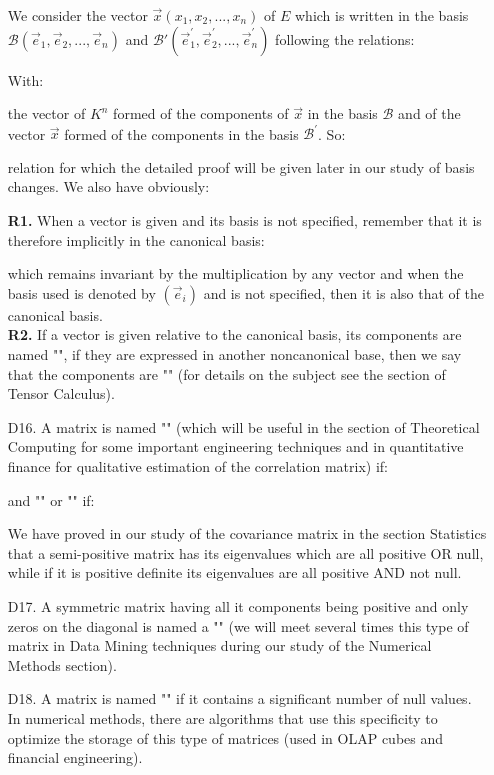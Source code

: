 \begin{enumerate}
		We consider the vector $\vec{x}(x_1,x_2,...,x_n)$ of $E$ which is written in the basis $\mathcal{B}(\vec{e}_1,\vec{e}_2,...,\vec{e}_n)$ and $\mathcal{B}'(\vec{e}_1^{'},\vec{e}_2^{'},...,\vec{e}_n^{'})$ following the relations:
		
		With:
		
		the vector of $K^n$ formed of the components of $\vec{x}$ in the basis $\mathcal{B}$ and of the vector $\vec{x}$ formed of the components in the basis $\mathcal{B}^{'}$. So:
		
		relation for which the detailed proof will be given later in our study of basis changes. We also have obviously:
		
		\begin{tcolorbox}[title=Remarks,colframe=black,arc=10pt]
		\textbf{R1.} When a vector is given and its basis is not specified, remember that it is therefore implicitly in the canonical basis:
		
		which remains invariant by the multiplication by any vector and when the basis used is denoted by $(\vec{e}_i)$ and is not specified, then it is also that of the canonical basis.\\
		
		\textbf{R2.} If a vector is given relative to the canonical basis, its components are named "",  if they are expressed in another noncanonical base, then we say that the components are "" (for details on the subject see the section of Tensor Calculus).
		\end{tcolorbox}
		
		\item[D16.] A matrix is named "" (which will be useful in the section of Theoretical Computing for some important engineering techniques and in quantitative finance for qualitative estimation of the correlation matrix) if:
		
		and "" or "" if:
		
		We have proved in our study of the covariance matrix in the section Statistics that a semi-positive matrix has its eigenvalues which are all positive OR null, while if it is positive definite its eigenvalues are all positive AND not null.
		
		\item[D17.] A symmetric matrix having all it components being positive and only zeros on the diagonal is named a "" (we will meet several times this type of matrix in Data Mining techniques during our study of the Numerical Methods section).
		
		\item[D18.] A matrix is named "" if it contains a significant number of null values. In numerical methods, there are algorithms that use this specificity to optimize the storage of this type of matrices (used in OLAP cubes and financial engineering).
	\end{enumerate}
	
